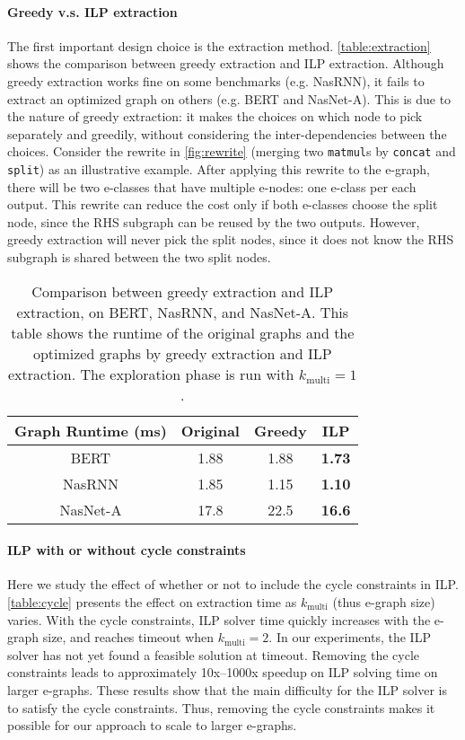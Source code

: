 \paragraph{Greedy v.s. ILP extraction}

The first important design choice is the extraction method.
\autoref{table:extraction} shows the comparison between greedy extraction and ILP extraction.
Although greedy extraction works fine on some benchmarks (e.g. NasRNN), it fails to extract an optimized graph on others (e.g. BERT and NasNet-A).
This is due to the nature of greedy extraction: it makes the choices on which node to pick separately and greedily, without considering the inter-dependencies between the choices.
Consider the rewrite in \autoref{fig:rewrite} (merging two \texttt{matmul}s by \texttt{concat} and \texttt{split}) as an illustrative example.
After applying this rewrite to the e-graph, there will be two e-classes that have multiple e-nodes: one e-class per each output.
This rewrite can reduce the cost only if both e-classes choose the split node, since the RHS subgraph can be reused by the two outputs.
However, greedy extraction will never pick the split nodes, since it does not know the RHS subgraph is shared between the two split nodes.

\begin{table}[]
    \centering
    \begin{tabular}{cccc}
    \hline
        {\bf Graph Runtime (ms)} & {\bf Original} & {\bf Greedy} & {\bf ILP} \\
    \hline
        BERT & 1.88 & 1.88 & \textbf{1.73} \\
        NasRNN & 1.85 & 1.15 & \textbf{1.10} \\
        NasNet-A & 17.8 & 22.5 & \textbf{16.6} \\
    \hline
    \end{tabular}
    \caption{Comparison between greedy extraction and ILP extraction, on BERT, NasRNN, and NasNet-A.
    This table shows the runtime of the original graphs and the optimized graphs by greedy extraction and ILP extraction.
    The exploration phase is run with $k_{\textrm{multi}} = 1$. }
    \label{table:extraction}
\end{table}

\paragraph{ILP with or without cycle constraints}

Here we study the effect of whether or not to include the cycle constraints in ILP.
\autoref{table:cycle} presents the effect on extraction time as $k_{\textrm{multi}}$ (thus e-graph size) varies.
With the cycle constraints, ILP solver time quickly increases with the e-graph size, and reaches timeout when $k_{\textrm{multi}}=2$.
In our experiments, the ILP solver has not yet found a feasible solution at timeout.
Removing the cycle constraints leads to approximately 10x--1000x speedup on ILP solving time on larger e-graphs.
These results show that the main difficulty for the ILP solver is to satisfy the cycle constraints.
Thus, removing the cycle constraints makes it possible for our approach to scale to larger e-graphs.

